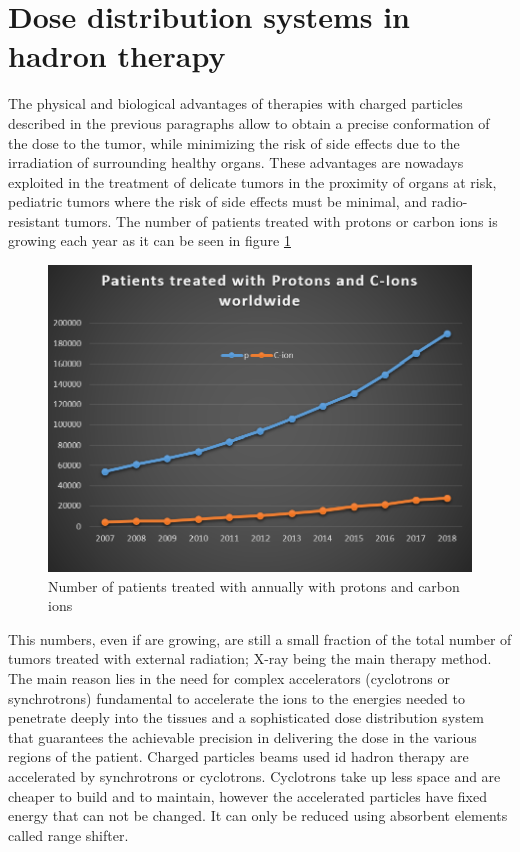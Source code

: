 \section{Dose distribution systems in hadron therapy}
The physical and biological advantages of therapies with charged particles described in the previous paragraphs allow to obtain a precise conformation of the dose to the tumor, while minimizing the risk of side effects due to the irradiation of surrounding healthy organs.
These advantages are nowadays exploited in the treatment of delicate tumors in the proximity of organs at risk, pediatric tumors where the risk of side effects must be minimal, and radio-resistant tumors.
The number of patients treated with protons or carbon ions is growing each year as it can be seen in figure \ref{fig:patientstreated}
\begin{figure}[H]
	\centering
	\includegraphics[width=0.7\linewidth]{IMG/ch1/PatientsTreated}
	\caption{Number of patients treated with annually with protons and carbon ions}
	\label{fig:patientstreated}
\end{figure}
\noindent This numbers, even if are growing, are still a small fraction of the total number of tumors treated with external radiation; X-ray being the main therapy method. 
The main reason lies in the need for complex accelerators (cyclotrons or synchrotrons) fundamental to accelerate the ions to
the energies needed to penetrate deeply into the tissues and a sophisticated dose distribution system that guarantees the achievable precision in delivering the dose in the various regions of the patient.
Charged particles beams used id hadron therapy are accelerated by synchrotrons or cyclotrons.
\newline
Cyclotrons take up less space and are cheaper to build and to maintain, however the accelerated particles have fixed energy that can not be changed. It can only be reduced using absorbent elements called range shifter.
